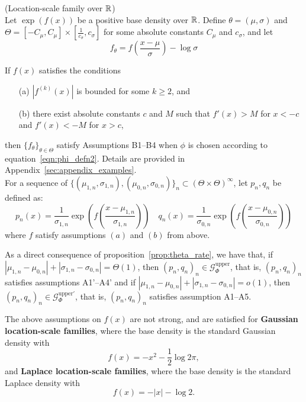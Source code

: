 \documentclass{article}
\begin{document}
\begin{example}
\label{ExaLocScale}
(Location-scale family over ${\mathbb R}$)\\
Let $\exp(f(x))$ be a positive base density over ${\mathbb R}$. Define $\theta = (\mu, \sigma)$ and $\Theta = [- C_{\mu}, C_{\mu}] \times \left[\frac{1}{c_{\sigma}}, c_{\sigma}\right]$ for some absolute constants $C_{\mu}$ and $c_{\sigma}$, and let 
\[
f_{\theta} = f\left( \frac{ x - \mu}{\sigma} \right) - \log \sigma
\]

If $f(x)$ satisfies the conditions
\begin{itemize}
\item[(a)] $|f^{(k)}(x)|$ is bounded for some $k \geq 2$, and
\item[(b)] there exist absolute constants $c$ and $M$ such that $f'(x) > M$ for $x < -c$ and $f'(x) < -M$ for $x > c$,
\end{itemize}
then $\{f_{\theta} \}_{\theta \in \Theta}$ satisfy Assumptions B1--B4 when $\phi$ is chosen according to equation~\eqref{eqn:phi_defn2}. Details are provided in Appendix~\ref{sec:appendix_examples}. \\


For a sequence of $\{(\mu_{1,n}, \sigma_{1,n}), (\mu_{0,n}, \sigma_{0,n})\}_n \subset (\Theta \times \Theta)^\infty$, let $p_n, q_n$ be defined as:
\[
  p_n(x) =  \frac{1}{\sigma_{1,n}} \exp\left( f\left( \frac{x - \mu_{1,n}}{\sigma_{1,n}} \right) \right) \quad
  q_n(x) =  \frac{1}{\sigma_{0,n}} \exp\left( f\left( \frac{x - \mu_{0,n}}{\sigma_{0,n}} \right) \right)   
\]
where $f$ satisfy assumptions $(a)$ and $(b)$ from above. 

As a direct consequence of proposition~\ref{prop:theta_rate}, we have that, if $|\mu_{1,n} - \mu_{0,n}| + |\sigma_{1,n} - \sigma_{0,n}| = \Theta(1)$, then $(p_n, q_n)_n \in \mathcal{G}^{\textrm{upper}}_\Phi$, that is, $(p_n, q_n)_n$ satisfies assumptions A1'--A4' and if  $|\mu_{1,n} - \mu_{0,n}| + |\sigma_{1,n} - \sigma_{0,n}| = o(1)$, then $(p_n, q_n)_n \in \mathcal{G}^{\textrm{upper} \prime}_\Phi$, that is, $(p_n, q_n)_n$ satisfies assumption A1--A5.

  

The above assumptions on $f(x)$ are not strong, and are satisfied for \textbf{Gaussian location-scale families}, where the base density is the standard Gaussian density with
\[
f(x) = -x^2 - \frac{1}{2} \log 2 \pi,
\]
and \textbf{Laplace location-scale families}, where the base density is the standard Laplace density with
\[
f(x) = - |x| - \log 2.
\]
\end{example}
\end{document}
